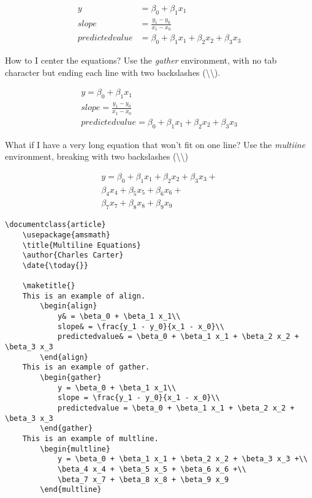 		\begin{align}
			y& = \beta_0 + \beta_1 x_1\\
			slope& = \frac{y_1 - y_0}{x_1 - x_0}\\
			predictedvalue& = \beta_0 + \beta_1 x_1 + \beta_2 x_2 + \beta_3 x_3
		\end{align}

		How to I center the equations? Use the \textit{gather} environment, with no tab character but ending each line with two backslashes (\textbackslash{}\textbackslash{}).

		\begin{gather}
			y = \beta_0 + \beta_1 x_1\\
			slope = \frac{y_1 - y_0}{x_1 - x_0}\\
			predictedvalue = \beta_0 + \beta_1 x_1 + \beta_2 x_2 + \beta_3 x_3
		\end{gather}

		What if I have a very long equation that won't fit on one line? Use the \textit{multiine} environment, breaking with two backslashes (\textbackslash{}\textbackslash{})

		\begin{multline}
			y = \beta_0 + \beta_1 x_1 + \beta_2 x_2 + \beta_3 x_3 +\\
			\beta_4 x_4 + \beta_5 x_5 + \beta_6 x_6 +\\
			\beta_7 x_7 + \beta_8 x_8 + \beta_9 x_9
		\end{multline}
		
		\begin{verbatim}
\documentclass{article}
	\usepackage{amsmath}
    \title{Multiline Equations}
    \author{Charles Carter}
    \date{\today{}}
 
    \maketitle{}
	This is an example of align.
		\begin{align}
			y& = \beta_0 + \beta_1 x_1\\
			slope& = \frac{y_1 - y_0}{x_1 - x_0}\\
			predictedvalue& = \beta_0 + \beta_1 x_1 + \beta_2 x_2 + \beta_3 x_3
		\end{align}
	This is an example of gather.
		\begin{gather}
			y = \beta_0 + \beta_1 x_1\\
			slope = \frac{y_1 - y_0}{x_1 - x_0}\\
			predictedvalue = \beta_0 + \beta_1 x_1 + \beta_2 x_2 + \beta_3 x_3
		\end{gather}
	This is an example of multline.
		\begin{multline}
			y = \beta_0 + \beta_1 x_1 + \beta_2 x_2 + \beta_3 x_3 +\\
			\beta_4 x_4 + \beta_5 x_5 + \beta_6 x_6 +\\
			\beta_7 x_7 + \beta_8 x_8 + \beta_9 x_9
		\end{multline}
	    
        \end{verbatim}


